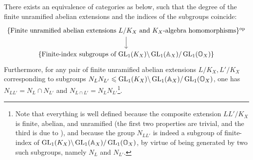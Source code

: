             \begin{theorem} \label{theorem: class_field_theory_for_global_function_fields_over_finite_fields}
                \cite[Theorem VI.6.1]{neukirch_2010_algebraic_number_theory} There exists an equivalence of categories as below, such that the degree of the finite unramified abelian extensions and the indices of the subgroups coincide:
                    $$
                        \begin{tikzcd}
                        	{\{\text{Finite unramified abelian extensions $L/K_X$ and $K_X$-algebra homomorphisms}\}^{\op}} \\
                        	{\{\text{Finite-index subgroups of $\GL_1(K_X)\backslash\GL_1(\A_X)/\GL_1(\bbO_{X})$}\}}
                        	\arrow[from=1-1, to=2-1]
                        \end{tikzcd}
                    $$ 
                 Furthermore, for any pair of finite unramified abelian extensions $L/K_X, L'/K_X$ corresponding to subgroups $N_L N_{L'} \leqslant \operatorname{GL}_1(K_X)\backslash\operatorname{GL}_1(\mathbb{A}_X)/\operatorname{GL}_1(\mathbb{O}_{X})$, one has $N_{L L'} = N_L \cap N_{L'}$ and $N_{L \cap L'} = N_L N_{L'}$\footnote{Note that everything is well defined because the composite extension $L L'/K_X$ is finite, abelian, and unramified (the first two properties are trivial, and the third is due to \cite[Corollary II.7.3]{neukirch_2010_algebraic_number_theory}), and because the group $N_{L L'}$ is indeed a subgroup of finite-index of $\operatorname{GL}_1(K_X)\backslash\operatorname{GL}_1(\mathbb{A}_X)/\operatorname{GL}_1(\mathbb{O}_{X})$, by virtue of being generated by two such subgroups, namely $N_L$ and $N_{L'}$.}.
            \end{theorem}
